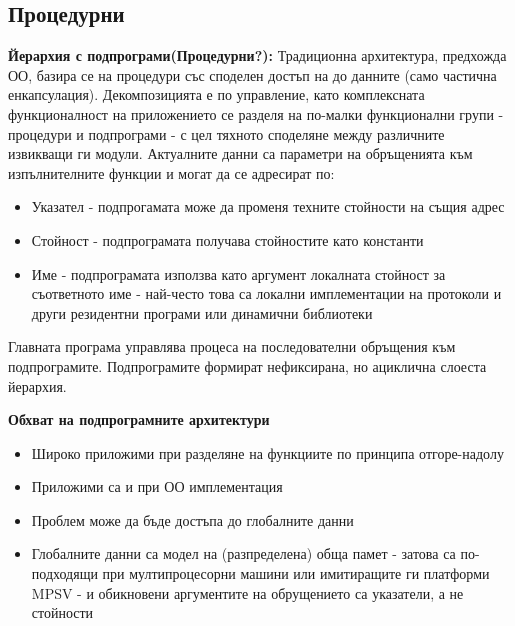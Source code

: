 \documentclass[11pt]{article} %
\begin{document}
\subsection{Процедурни}
\textbf{Йерархия с подпрограми(Процедурни?):} Традиционна архитектура, предхожда ОО, базира се на процедури със споделен достъп на до данните (само частична енкапсулация). Декомпозицията е по управление, като комплексната функционалност на приложението се разделя на по-малки функционални групи - процедури и подпрограми - с цел тяхното споделяне между различните извикващи ги модули. Актуалните данни са параметри на обръщенията към изпълнителните функции и могат да се адресират по:
\begin{itemize}[noitemsep]
	\item Указател - подпрогамата може да променя техните стойности на същия адрес
	\item Стойност - подпрограмата получава стойностите като константи
	\item Име - подпрограмата използва като аргумент локалната стойност за съответното име - най-често това са локални имплементации на протоколи и други резидентни програми или динамични библиотеки
\end{itemize}
Главната програма управлява процеса на последователни обръщения към подпрограмите. Подпрограмите формират нефиксирана, но ациклична слоеста йерархия.\\\par

\textbf{Обхват на подпрограмните архитектури}\\
\begin{itemize}[noitemsep]
	\item Широко приложими при разделяне на функциите по принципа отгоре-надолу
	\item Приложими са и при ОО имплементация
	\item Проблем може да бъде достъпа до глобалните данни
	\item Глобалните данни са модел на (разпределена) обща памет - затова са по-подходящи при мултипроцесорни машини или имитиращите ги платформи MPSV - и обикновени аргументите на обрущението са указатели, а не стойности
\end{itemize}
\end{document}
